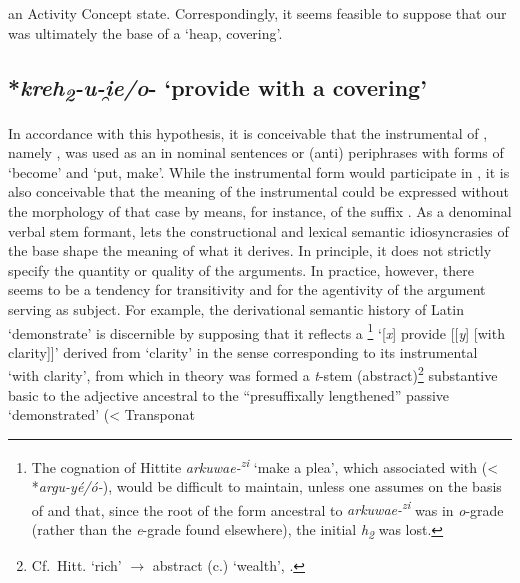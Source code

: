 \documentclass[output=paper,colorlinks,citecolor=brown]{langscibook}
\begin{document}
an Activity  Concept state. Correspondingly, it seems feasible to suppose that our  was ultimately the base of a  ‘heap, covering’. 

\subsection{*\textit{kreh\textsubscript{2}-u-i̯e/o}- ‘provide with a covering’}

In accordance with this hypothesis, it is conceivable that the instrumental of , namely , was used as an  in nominal sentences or (anti)   periphrases with forms of  ‘become’ and  ‘put, make’. While the instrumental form would participate in , it is also conceivable that the meaning of the instrumental could be expressed without the morphology of that case by means, for instance, of the suffix . As a denominal verbal  stem formant,  lets the constructional and lexical semantic idiosyncrasies of the base shape the meaning of what it derives. In principle, it does not strictly specify the quantity or quality of the arguments. In practice, however, there seems to be a tendency for transitivity and for the agentivity  of the argument serving as subject. For example, the derivational semantic history of Latin  ‘demonstrate’ is discernible by supposing that it reflects a   \footnote{The cognation of Hittite \textit{arkuwae-\textsuperscript{zi}}  ‘make a plea’, which \citealt{Melchert1998} associated with  (< *\textit{argu-yé/ó-}), would be difficult to maintain, unless one assumes on the basis of \citealt{Kloekhorst2006} and \citeyear[206]{Kloekhorst2008} that, since the root  of the form ancestral to \textit{arkuwae-\textsuperscript{zi}}  was in \textit{o}-grade (rather than the \textit{e}-grade found elsewhere), the initial \textit{h\textsubscript{2}} was lost.} ‘[\textit{x}] provide [[\textit{y}] [with clarity]]’ derived from  ‘clarity’ in the sense corresponding to its instrumental  ‘with clarity’, from which in theory was formed a \textit{t}{}-stem (abstract)\footnote{Cf.\ Hitt.  ‘rich’ $\rightarrow$ abstract  (c.) ‘wealth’, \citealt{Nussbaum2004}.} substantive basic to the  adjective ancestral to the “presuffixally lengthened”  passive   ‘demonstrated’ (< Transponat  
\end{document}
